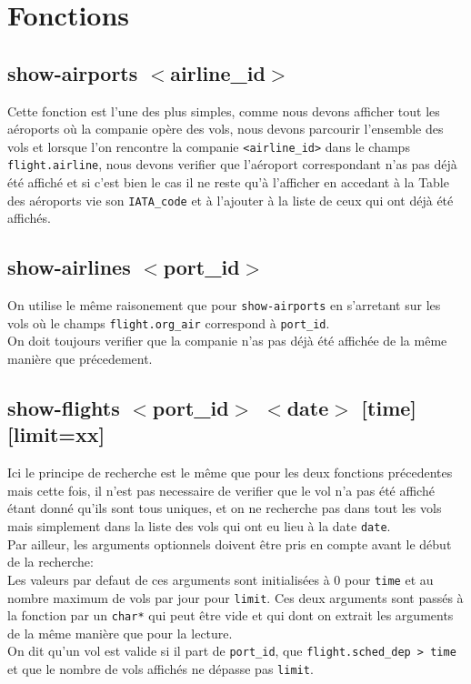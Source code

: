 \documentclass[a4paper, 9pt]{article}
\begin{document}
	\section{Fonctions}
	\subsection{\texorpdfstring{show-airports $<$airline\_id$>$}{show-airports <airline\_id>}}
	Cette fonction est l'une des plus simples, comme nous devons afficher tout les aéroports où la companie opère des vols, nous devons parcourir l'ensemble des vols et lorsque l'on rencontre la companie \lstinline|<airline_id>| dans le champs \lstinline|flight.airline|, nous devons verifier que l'aéroport correspondant n'as pas déjà été affiché et si c'est bien le cas il ne reste qu'à l'afficher en accedant à la Table des aéroports vie son \lstinline|IATA_code| et à l'ajouter à la liste de ceux qui ont déjà été affichés.
	
	\subsection{\texorpdfstring{show-airlines $<$port\_id$>$}{show-airlines <port\_id>}}
	On utilise le même raisonement que pour \lstinline|show-airports| en s'arretant sur les vols où le champs \lstinline|flight.org_air| correspond à \lstinline|port_id|.\\
	On doit toujours verifier que la companie n'as pas déjà été affichée de la même manière que précedement.\\
	
	\subsection{\texorpdfstring{show-flights $<$port\_id$>$ $<$date$>$ [time] [limit=xx]}{}}
	Ici le principe de recherche est le même que pour les deux fonctions précedentes mais cette fois, il n'est pas necessaire de verifier que le vol n'a pas été affiché étant donné qu'ils sont tous uniques, et on ne recherche pas dans tout les vols mais simplement dans la liste des vols qui ont eu lieu à la date \lstinline|date|.\\
	Par ailleur, les arguments optionnels doivent être pris en compte avant le début de la recherche:\\
	Les valeurs par defaut de ces arguments sont initialisées à 0 pour \lstinline|time| et au nombre maximum de vols par jour pour \lstinline|limit|. Ces deux arguments sont passés à la fonction par un \lstinline|char*| qui peut être vide et qui dont on extrait les arguments de la même manière que pour la lecture.\\
	On dit qu'un vol est valide si il part de \lstinline|port_id|, que \lstinline|flight.sched_dep > time| et que le nombre de vols affichés ne dépasse pas \lstinline|limit|.\\ 
	
\end{document}
